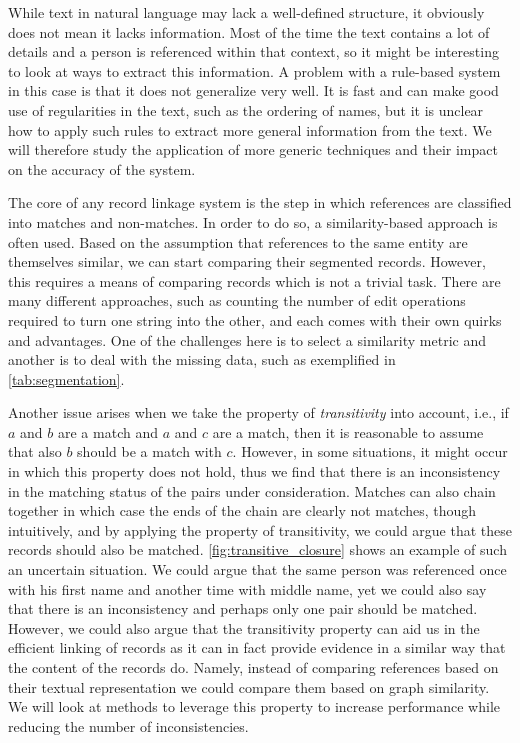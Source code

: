 While text in natural language may lack a well-defined structure, it obviously does not mean it lacks information.
Most of the time the text contains a lot of details and a person is referenced within that context, so it might be interesting to look at ways to extract this information.
A problem with a rule-based system in this case is that it does not generalize very well.
It is fast and can make good use of regularities in the text, such as the ordering of names, but it is unclear how to apply such rules to extract more general information from the text.
We will therefore study the application of more generic techniques and their impact on the accuracy of the system.

The core of any record linkage system is the step in which references are classified into matches and non-matches.
In order to do so, a similarity-based approach is often used.
Based on the assumption that references to the same entity are themselves similar, we can start comparing their segmented records.
However, this requires a means of comparing records which is not a trivial task.
There are many different approaches, such as counting the number of edit operations required to turn one string into the other, and each comes with their own quirks and advantages.
One of the challenges here is to select a similarity metric and another is to deal with the missing data, such as exemplified in \cref{tab:segmentation}.

Another issue arises when we take the property of \emph{transitivity} into account, i.e., if $a$ and $b$ are a match and $a$ and $c$ are a match, then it is reasonable to assume that also $b$ should be a match with $c$.
However, in some situations, it might occur in which this property does not hold, thus we find that there is an inconsistency in the matching status of the pairs under consideration.
Matches can also chain together in which case the ends of the chain are clearly not matches, though intuitively, and by applying the property of transitivity, we could argue that these records should also be matched.
\cref{fig:transitive_closure} shows an example of such an uncertain situation.
We could argue that the same person was referenced once with his first name and another time with middle name, yet we could also say that there is an inconsistency and perhaps only one pair should be matched.
However, we could also argue that the transitivity property can aid us in the efficient linking of records as it can in fact provide evidence in a similar way that the content of the records do.
Namely, instead of comparing references based on their textual representation we could compare them based on graph similarity.
We will look at methods to leverage this property to increase performance while reducing the number of inconsistencies.

